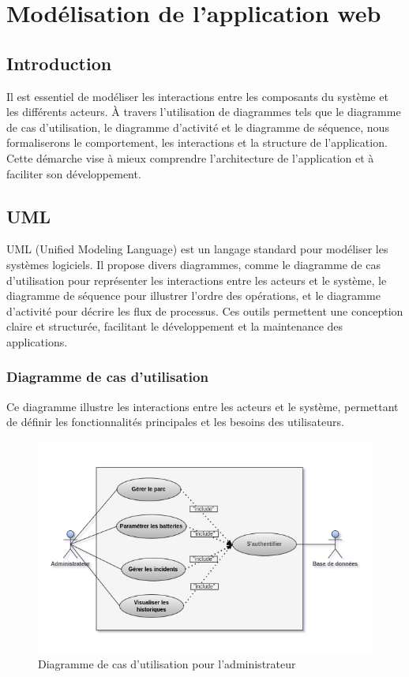 \newpage
\section{ Modélisation de l'application web}
\subsection{Introduction}

Il est essentiel de modéliser les interactions entre les composants du système et les différents acteurs. À travers l'utilisation de diagrammes tels que le diagramme de cas d'utilisation, le diagramme d'activité et le diagramme de séquence, nous formaliserons le comportement, les interactions et la structure de l'application. Cette démarche vise à mieux comprendre l'architecture de l'application et à faciliter son développement.

\subsection{UML}
UML (Unified Modeling Language) est un langage standard pour modéliser les systèmes logiciels. Il propose divers diagrammes, comme le diagramme de cas d'utilisation pour représenter les interactions entre les acteurs et le système, le diagramme de séquence pour illustrer l'ordre des opérations, et le diagramme d'activité pour décrire les flux de processus. Ces outils permettent une conception claire et structurée, facilitant le développement et la maintenance des applications.
\subsubsection{Diagramme de cas d'utilisation}
Ce diagramme illustre les interactions entre les acteurs et le système, permettant de définir les fonctionnalités principales et les besoins des utilisateurs.

\begin{figure}[H]
	\centering
	\includegraphics[width=17cm]{./img/composants/diagramme/Casutilisation.png}
	\caption{Diagramme de cas d'utilisation pour l'administrateur}
\end{figure}

